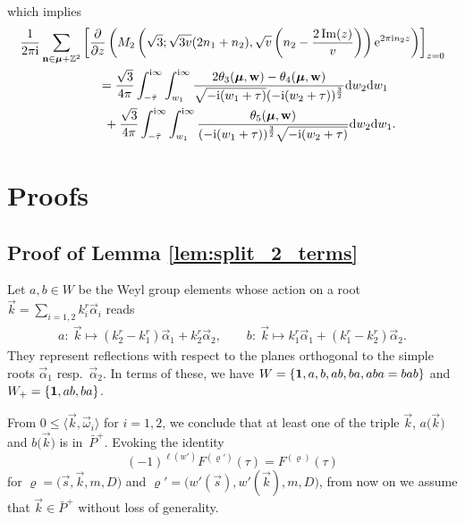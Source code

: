 \documentclass[10pt,a4paper]{amsart}
\def\BZ{\mathbb{Z}}
\def\bos{\varrho}
\def\al{\alpha}
\def\bmu{\boldsymbol{\mu}}
\theoremstyle{definition}
\numberwithin{equation}{section}
\begin{document}
which implies
\begin{gather*}%
	\frac{1}{2\pi {\rm i}}
	\sum_{\mathbf{n} \in \boldsymbol{\mu} + \BZ^2}
	\left[\frac{\partial}{\partial z}
	\left(M_2\left(\sqrt 3;\sqrt{3v}(2n_1+n_2),\sqrt{v}
	\left(n_2-\frac{2\operatorname{Im}(z)}{v}\right)\right)
	{\rm e}^{2\pi {\rm i}n_2z}\right)\right]_{z=0}\\
	\qquad=\frac{\sqrt{3}}{4 \pi}
	\int_{-\bar{\tau}}^{{\rm i} \infty}
	\int_{w_1}^{{\rm i} \infty}
	\frac{2\theta_3({\bmu}, {\bf w})-
		\theta_4({\bmu}, {\bf w})}{\sqrt{-{\rm i}(w_1+\tau)}(-{\rm i}(w_2+\tau)
		)^{\frac{3}{2}}}{\rm d}w_2{\rm d}w_1 \\
	\qquad\phantom{=}{}+\frac{\sqrt{3}}{4 \pi}\int_{-\bar{\tau}}^{{\rm i} \infty}\int_{w_1}^{{\rm i} \infty}\frac{\theta_5({\bmu}, {\bf w})}{(-{\rm i}(w_1+\tau))^{\frac{3}{2}}\sqrt{-{\rm i}(w_2+\tau)}}{\rm d}w_2{\rm d}w_1 .
\end{gather*}


\section{Proofs}
\subsection{Proof of Lemma \ref{lem:split_2_terms}}\label{pf_lem:split_2_terms}

Let $a, b\in W$ be the Weyl group elements whose action on a root $\vec k=\sum_{i=1,2} k_i^r \vec \alpha_i $ reads
\begin{gather}
	a\colon\ \vec{k} \mapsto (k_2^r-k_1^r)\vec{\al}_1 +k_2^r \vec{\al}_2,
	\qquad
	b\colon\ \vec{k} \mapsto k_1^r \vec{\al}_1 + (k_1^r-k_2^r) \vec{\al}_2 .
	\label{eq:abaction}
\end{gather}
They represent reflections with respect to the planes orthogonal to the simple roots $\vec\alpha_1$ resp.\ $\vec\alpha_2$.
In terms of these, we have $W=\{{\bf 1}, a, b, ab, ba, aba=bab\}$ and $W_+=\{{\bf 1}, ab, ba\}$.

From $0\leq \langle \vec k, \vec\omega_i\rangle$ for $i=1,2$, we conclude that at least one of the triple $\vec{k}$, $a\bigl(\vec{k}\bigr)$ and $b\bigl(\vec{k}\bigr)$ is in~$\bar P^+$. Evoking the identity
\begin{equation*}
	(-1)^{\ell(w')} F^{(\bos')} (\tau) = F^{(\bos)} (\tau)
\end{equation*}
for $\bos=\bigl(\vec{s},\vec k,m,D\bigr)$ and $\bos'=\bigl(w'(\vec{s}),w'(\vec k),m,D\bigr)$, from now on we assume that $\vec{k}\in \bar P^+$ without loss of generality.
\end{document}
